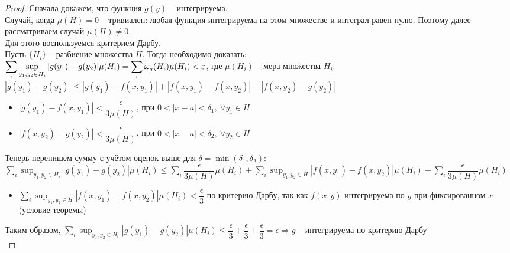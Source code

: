 \begin{proof}
    Сначала докажем, что функция $g(y)$ -- интегрируема. \\
    Случай, когда $\mu(H) = 0$ -- тривиален: любая функция интегрируема на этом множестве 
    и интеграл равен нулю. Поэтому далее рассматриваем случай $\mu(H) \neq 0$. \\  
    Для этого воспользуемся критерием Дарбу.\\
    Пусть $\{H_i\}$ -- разбиение множества $H$. Тогда необходимо доказать: \\
    $\displaystyle \sum_{i} \sup_{y_1, y_2 \in H_i} |g(y_1) - g(y_2)| \mu(H_i) =
    \sum_{i} \omega_{g}(H_i) \mu(H_i) < \varepsilon$, где $\mu(H_i)$ -- мера множества $H_i$. \\ 
    $|g(y_1) - g(y_2)| \leqslant |g(y_1) - f(x, y_1)| + |f(x, y_1) - f(x, y_2)| 
    + |f(x, y_2) - g(y_2)|$
    \begin{itemize}
        \item $|g(y_1) - f(x, y_1)| < \dfrac{\epsilon}{3 \mu(H)}$,
        при $ 0 < |x - a| < \delta_1, \ \forall y_1 \in H$
        \item $|f(x, y_2) - g(y_2)| < \dfrac{\epsilon}{3 \mu(H)}$,
        при $ 0 < |x - a| < \delta_2, \ \forall y_2 \in H$
    \end{itemize} 
    Теперь перепишем сумму с учётом оценок выше для $\delta = \min(\delta_1, \delta_2)$: \\
     $\displaystyle \sum_{i} \sup_{y_1, y_2 \in H_i} |g(y_1) - g(y_2)| \mu(H_i) \leqslant
    \sum_i \dfrac{\epsilon}{3 \mu(H)} \mu(H_i) + 
    \sum_i \sup_{y_1, y_2 \in H} |f(x, y_1) - f(x, y_2)| \mu(H_i) +
    \sum_i \dfrac{\epsilon}{3 \mu(H)} \mu(H_i)$ \\
    \begin{itemize}
        \item $\displaystyle \sum_i \sup_{y_1, y_2 \in H} |f(x, y_1) - f(x, y_2)| \mu(H_i) 
        < \dfrac{\epsilon}{3}$ по критерию Дарбу, так как $f(x, y)$ интегрируема по $y$ при
        фиксированном $x$ (условие теоремы)
    \end{itemize} 
    Таким образом, $\displaystyle \sum_{i} \sup_{y_1, y_2 \in H_i} |g(y_1) - g(y_2)| \mu(H_i)
    \leqslant \dfrac{\epsilon}{3} + \dfrac{\epsilon}{3} + \dfrac{\epsilon}{3} = \epsilon
    \Rightarrow g$ -- интегрируема по критерию Дарбу \\
    

\end{proof}

